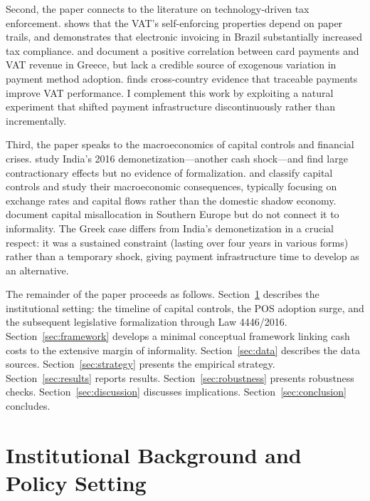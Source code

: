 \documentclass[12pt]{article}
\begin{document}
Second, the paper connects to the literature on technology-driven tax enforcement. \citet{pomeranz2015no} shows that the VAT's self-enforcing properties depend on paper trails, and \citet{kleven2016can} demonstrates that electronic invoicing in Brazil substantially increased tax compliance. \citet{hondroyiannis2017card} and \citet{hondroyiannis2020effect} document a positive correlation between card payments and VAT revenue in Greece, but lack a credible source of exogenous variation in payment method adoption. \citet{madzharova2020traceable} finds cross-country evidence that traceable payments improve VAT performance. I complement this work by exploiting a natural experiment that shifted payment infrastructure discontinuously rather than incrementally.

Third, the paper speaks to the macroeconomics of capital controls and financial crises. \citet{chodorowreich2019cash} study India's 2016 demonetization---another cash shock---and find large contractionary effects but no evidence of formalization. \citet{fernandez2015capital} and \citet{forbes2012capital} classify capital controls and study their macroeconomic consequences, typically focusing on exchange rates and capital flows rather than the domestic shadow economy. \citet{gopinath2017capital} document capital misallocation in Southern Europe but do not connect it to informality. The Greek case differs from India's demonetization in a crucial respect: it was a sustained constraint (lasting over four years in various forms) rather than a temporary shock, giving payment infrastructure time to develop as an alternative.

The remainder of the paper proceeds as follows. Section~\ref{sec:background} describes the institutional setting: the timeline of capital controls, the POS adoption surge, and the subsequent legislative formalization through Law 4446/2016. Section~\ref{sec:framework} develops a minimal conceptual framework linking cash costs to the extensive margin of informality. Section~\ref{sec:data} describes the data sources. Section~\ref{sec:strategy} presents the empirical strategy. Section~\ref{sec:results} reports results. Section~\ref{sec:robustness} presents robustness checks. Section~\ref{sec:discussion} discusses implications. Section~\ref{sec:conclusion} concludes.


\section{Institutional Background and Policy Setting}
\label{sec:background}
\end{document}
